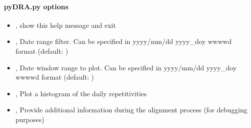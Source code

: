 \documentclass[letterpaper,10pt,english]{sphinxmanual}
\begin{document}
\paragraph{pyDRA.py options}
\label{\detokenize{stacker:pyDRA.py-options}}\begin{itemize}
\item {} 
\sphinxAtStartPar
{\hyperref[\detokenize{stacker:pyDRA.py--h}]{}}, {\hyperref[\detokenize{stacker:pyDRA.py---help}]{}} \sphinxhyphen{} show this help message and exit

\item {} 
\sphinxAtStartPar
{\hyperref[\detokenize{stacker:pyDRA.py--d}]{}} , {\hyperref[\detokenize{stacker:pyDRA.py---date_filter}]{}}  \sphinxhyphen{} Date range filter. Can be specified in yyyy/mm/dd yyyy\_doy  wwww\sphinxhyphen{}d format (default: )

\item {} 
\sphinxAtStartPar
{\hyperref[\detokenize{stacker:pyDRA.py--w}]{}} , {\hyperref[\detokenize{stacker:pyDRA.py---plot_window}]{}}  \sphinxhyphen{} Date window range to plot. Can be specified in yyyy/mm/dd yyyy\_doy  wwww\sphinxhyphen{}d format (default: )

\item {} 
\sphinxAtStartPar
{\hyperref[\detokenize{stacker:pyDRA.py--hist}]{}}, {\hyperref[\detokenize{stacker:pyDRA.py---histogram}]{}} \sphinxhyphen{} Plot a histogram of the daily repetitivities

\item {} 
\sphinxAtStartPar
{\hyperref[\detokenize{stacker:pyDRA.py--v}]{}}, {\hyperref[\detokenize{stacker:pyDRA.py---verbose}]{}} \sphinxhyphen{} Provide additional information during the alignment process (for debugging purposes)


\end{itemize}
\end{document}
